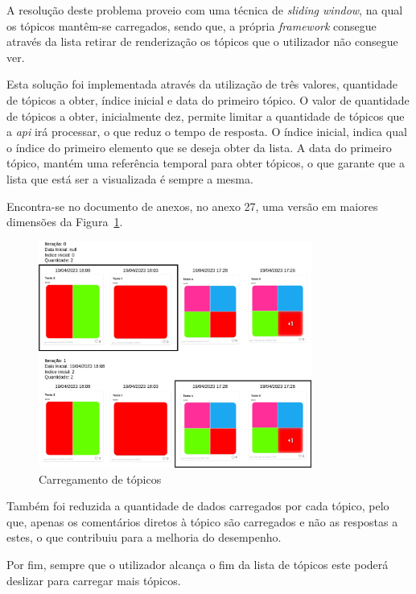 A resolução deste problema proveio com uma técnica de \textit{sliding window}, na qual os tópicos mantêm-se carregados, sendo que, a própria \textit{framework} consegue através da lista retirar de renderização os tópicos que o utilizador não consegue ver. 

Esta solução foi implementada através da utilização de três valores, quantidade de tópicos a obter, índice inicial e data do primeiro tópico. O valor de quantidade de tópicos a obter, inicialmente dez, permite limitar a quantidade de tópicos que a \textit{\acrshort{api}} irá processar, o que reduz o tempo de resposta. O índice inicial, indica qual o índice do primeiro elemento que se deseja obter da lista. A data do primeiro tópico, mantém uma referência temporal para obter tópicos, o que garante que a lista que está ser a visualizada é sempre a mesma.

Encontra-se no documento de anexos, no anexo 27, uma versão em maiores dimensões da Figura~\ref*{fig:74}.

\begin{figure}[htb]
 \centering
 \includegraphics[width=0.8\textwidth]{images/implementacao/frontend/forum/loading_topics/topics_loading.png}
 \caption{Carregamento de tópicos}
 \label{fig:74}
\end{figure}
Também foi reduzida a quantidade de dados carregados por cada tópico, pelo que, apenas os comentários diretos à tópico são carregados e não as respostas a estes, o que contribuiu para a melhoria do desempenho.

Por fim, sempre que o utilizador alcança o fim da lista de tópicos este poderá deslizar para carregar mais tópicos.

\newpage

